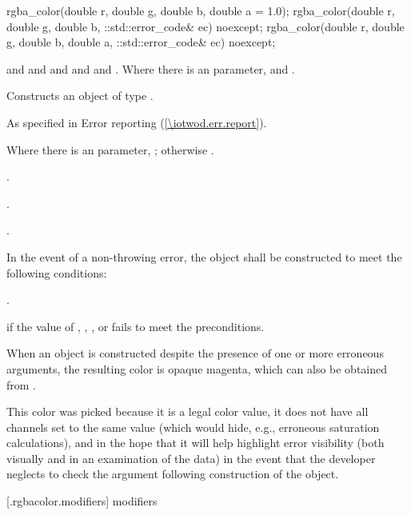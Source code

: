 \begin{itemdecl}
	rgba_color(double r, double g, double b, double a = 1.0);
  	rgba_color(double r, double g, double b, ::std::error_code& ec) noexcept;
  	rgba_color(double r, double g, double b, double a, ::std::error_code& ec) noexcept;
\end{itemdecl}
\begin{itemdescr}
	\pnum
	\requires
	 and  and  and  and  and . Where there is an  parameter,  and .
	
	\pnum
	\effects
	Constructs an object of type .

	\pnum
	\throws
	As specified in Error reporting (\ref{\iotwod.err.report}).
	
	\pnum
	\postconditions
	Where there is an  parameter, ; otherwise .
	
	\pnum
	.
	
	\pnum
	.
	
	\pnum
	.
	
	\pnum
	\remarks
	In the event of a non-throwing error, the object shall be constructed to meet the following conditions:
	
	\pnum
	.
	
	\pnum
	\errors
	 if the value of , , , or  fails to meet the preconditions.
	
	\pnum
	\realnotes
	When an object is constructed despite the presence of one or more erroneous arguments, the resulting color is opaque magenta, which can also be obtained from .
	
	\pnum
	This color was picked because it is a legal color value, it does not have all channels set to the same value (which would hide, e.g., erroneous saturation calculations), and in the hope that it will help highlight error visibility (both visually and in an examination of the data) in the event that the developer neglects to check the  argument following construction of the object.
\end{itemdescr}

 [\iotwod.rgbacolor.modifiers]{ modifiers}

